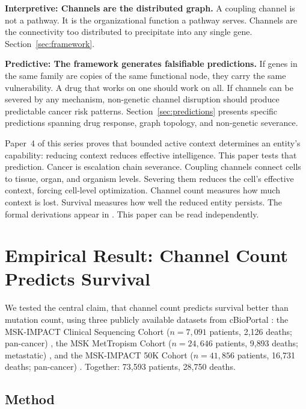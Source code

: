 \documentclass[11pt]{article}
\begin{document}
\textbf{Interpretive: Channels are the distributed graph.} A
coupling channel is not a pathway. It is the organizational function
a pathway serves. Channels are the connectivity too distributed to
precipitate into any single gene. Section~\ref{sec:framework}.

\textbf{Predictive: The framework generates falsifiable predictions.}
If genes in the same family are copies of the same functional node,
they carry the same vulnerability. A drug that works on one should
work on all. If channels can be severed by any mechanism, non-genetic
channel disruption should produce predictable cancer risk patterns.
Section~\ref{sec:predictions} presents specific predictions spanning
drug response, graph topology, and non-genetic severance.

Paper~4 of this series \cite{McCarthy2026d} proves that bounded
active context determines an entity's capability: reducing context
reduces effective intelligence. This paper tests that prediction.
Cancer is escalation chain severance. Coupling channels connect
cells to tissue, organ, and organism levels. Severing them reduces
the cell's effective context, forcing cell-level optimization.
Channel count measures how much context is lost. Survival measures
how well the reduced entity persists. The formal derivations appear
in \cite{McCarthy2026a, McCarthy2026b, McCarthy2026c,
McCarthy2026d}. This paper can be read independently.

\section{Empirical Result: Channel Count Predicts Survival}
\label{sec:empirical}

We tested the central claim, that channel count predicts survival
better than mutation count, using three publicly available datasets
from cBioPortal \cite{Cerami2012}: the MSK-IMPACT Clinical
Sequencing Cohort ($n = 7{,}091$ patients, 2{,}126 deaths;
pan-cancer) \cite{Zehir2017}, the MSK MetTropism Cohort
($n = 24{,}646$ patients, 9{,}893 deaths; metastatic)
\cite{Nguyen2022}, and the MSK-IMPACT 50K Cohort
($n = 41{,}856$ patients, 16{,}731 deaths; pan-cancer)
\cite{Bandlamudi2024}. Together: 73{,}593 patients, 28{,}750 deaths.

\subsection{Method}
\end{document}
